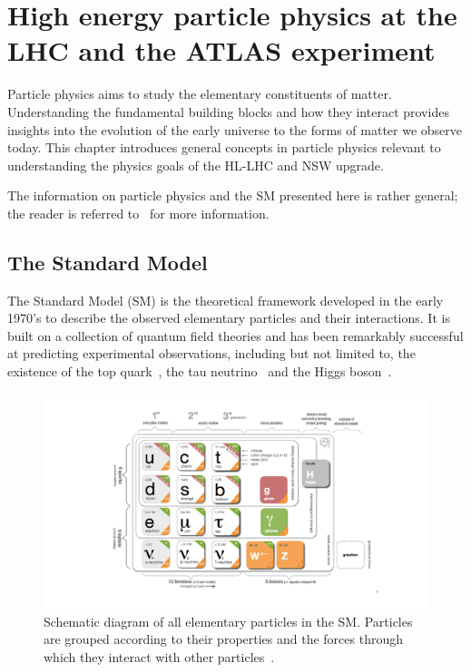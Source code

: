 
\chapter{High energy particle physics at the LHC and the ATLAS experiment}
\label{chap:lhc_atlas}

Particle physics aims to study the elementary constituents of matter. Understanding the fundamental building blocks and how they interact provides insights into the evolution of the early universe to the forms of matter we observe today. This chapter introduces general concepts in particle physics relevant to understanding the physics goals of the HL-LHC and NSW upgrade. 

The information on particle physics and the SM presented here is rather general; the reader is referred to~\cite{griffiths_introduction_2011, peskin_introduction_1995, zyla_review_2020} for more information. 

\section{The Standard Model}

The Standard Model (SM) is the theoretical framework developed in the early 1970's to describe the observed elementary particles and their interactions.  It is built on a collection of quantum field theories and has been remarkably successful at predicting experimental observations, including but not limited to, the existence of the top quark~\cite{kobayashi_cp-violation_1973}, the tau neutrino~\cite{perl_evidence_1975} and the Higgs boson~\cite{englert_broken_1964, higgs_broken_1964}. 

\begin{figure}
    \centering
    \includegraphics[width = \textwidth]{figures/standardmodel_galbraith_carsten.pdf}
    \caption{Schematic diagram of all elementary particles in the SM.  Particles are grouped according to their properties and the forces through which they interact with other particles~\cite{galbraith_ux_2013}.}
    \label{fig:standard_model}
\end{figure}

